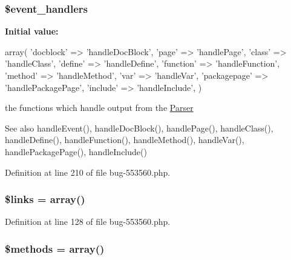 \hypertarget{classi_new_render_a43c58b8476d3252c39f474e1eb9169df}{
\subsubsection[{\$event\-\_\-handlers}]{\setlength{\rightskip}{0pt plus 5cm}\$event\-\_\-handlers}}\label{classi_new_render_a43c58b8476d3252c39f474e1eb9169df}
{\bfseries \-Initial value\-:}
\begin{DoxyCode}
 array(
                        'docblock' => 'handleDocBlock',
                        'page' => 'handlePage',
                        'class' => 'handleClass',
                        'define' => 'handleDefine',
                        'function' => 'handleFunction',
                        'method' => 'handleMethod',
                        'var' => 'handleVar',
                        'packagepage' => 'handlePackagePage',
                        'include' => 'handleInclude',
                        )
\end{DoxyCode}
the functions which handle output from the \hyperlink{class_parser}{\-Parser} \begin{DoxySeeAlso}{\-See also}
handle\-Event(), handle\-Doc\-Block(), handle\-Page(), handle\-Class(), handle\-Define(), handle\-Function(), handle\-Method(), handle\-Var(), handle\-Package\-Page(), handle\-Include() 
\end{DoxySeeAlso}


\-Definition at line 210 of file bug-\/553560.\-php.

\hypertarget{classi_new_render_a4ca8be3ff3cf95aa3af546449c1f1bec}{
\subsubsection[{\$links}]{\setlength{\rightskip}{0pt plus 5cm}\$links = array()}}\label{classi_new_render_a4ca8be3ff3cf95aa3af546449c1f1bec}


\-Definition at line 128 of file bug-\/553560.\-php.

\hypertarget{classi_new_render_a802753499268a04da139bd6e6ef89b35}{
\subsubsection[{\$methods}]{\setlength{\rightskip}{0pt plus 5cm}\$methods = array()}}\label{classi_new_render_a802753499268a04da139bd6e6ef89b35}


